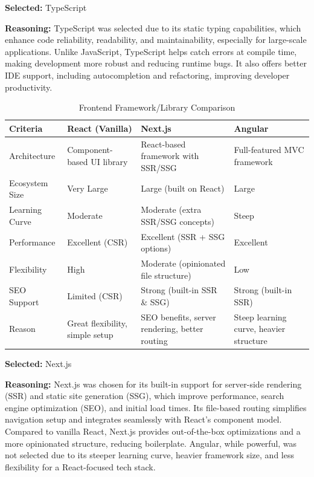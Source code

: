 \textbf{Selected:} TypeScript \par
\textbf{Reasoning:} TypeScript was selected due to its static typing capabilities, which enhance code reliability, readability, and maintainability, especially for large-scale applications. Unlike JavaScript, TypeScript helps catch errors at compile time, making development more robust and reducing runtime bugs. It also offers better IDE support, including autocompletion and refactoring, improving developer productivity.

\vspace{2em}

\begin{table}[H]
\centering
\caption{Frontend Framework/Library Comparison}
\begin{tabular}{|l|p{4cm}|p{4cm}|p{4cm}|}
\hline
\textbf{Criteria}       & \textbf{React (Vanilla)}      & \textbf{Next.js}               & \textbf{Angular}               \\
\hline
Architecture            & Component-based UI library   & React-based framework with SSR/SSG & Full-featured MVC framework    \\
Ecosystem Size          & Very Large                   & Large (built on React)         & Large                          \\
Learning Curve          & Moderate                     & Moderate (extra SSR/SSG concepts) & Steep                          \\
Performance             & Excellent (CSR)              & Excellent (SSR + SSG options)  & Excellent                      \\
Flexibility             & High                         & Moderate (opinionated file structure) & Low                           \\
SEO Support             & Limited (CSR)                & Strong (built-in SSR \& SSG)   & Strong (built-in SSR)          \\
Reason                  & Great flexibility, simple setup & SEO benefits, server rendering, better routing & Steep learning curve, heavier structure \\
\hline
\end{tabular}
\label{tab:frontend-framework-comparison}
\end{table}

\textbf{Selected:} Next.js \par
\textbf{Reasoning:} Next.js was chosen for its built-in support for server-side rendering (SSR) and static site generation (SSG), which improve performance, search engine optimization (SEO), and initial load times. Its file-based routing simplifies navigation setup and integrates seamlessly with React’s component model. Compared to vanilla React, Next.js provides out-of-the-box optimizations and a more opinionated structure, reducing boilerplate. Angular, while powerful, was not selected due to its steeper learning curve, heavier framework size, and less flexibility for a React-focused tech stack.

